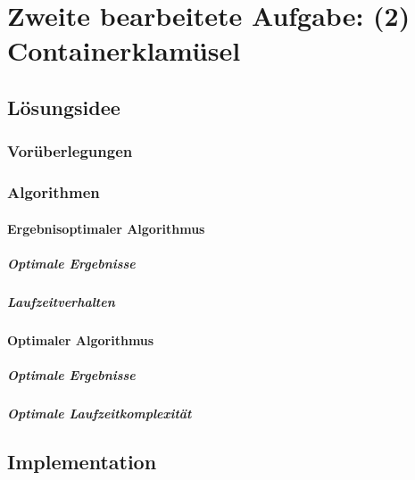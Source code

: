 \section{Zweite bearbeitete Aufgabe: (2) Containerklamüsel}
\subsection{Lösungsidee}
\subsubsection{Vorüberlegungen}
\subsubsection{Algorithmen}
\paragraph{Ergebnisoptimaler Algorithmus}
\subparagraph{Optimale Ergebnisse}
\subparagraph{Laufzeitverhalten} %
\paragraph{Optimaler Algorithmus}
\subparagraph{Optimale Ergebnisse}

\subparagraph{Optimale Laufzeitkomplexität}

\subsection{Implementation}
